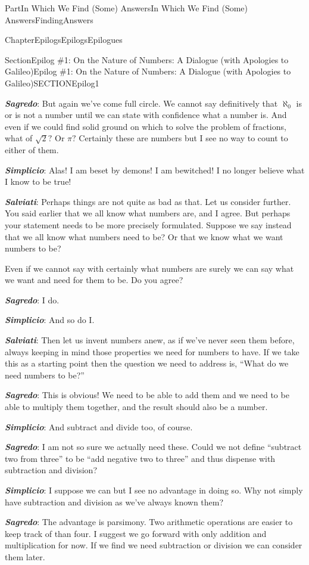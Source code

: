 \documentclass[oneside,10pt,]{book}
\newcommand{\alert}[1]{\textbf{\textit{#1}}}
\numberwithin{equation}{part}
\begin{document}
\begin{partptx}{Part}{In Which We Find (Some) Answers}{}{In Which We Find (Some) Answers}{}{}{FindingAnswers}
\begin{chapterptx}{Chapter}{Epilogs}{}{Epilogs}{}{}{Epilogues}
\begin{sectionptx}{Section}{Epilog \#1: On the Nature of Numbers: A Dialogue (with Apologies to Galileo)}{}{Epilog \#1: On the Nature of Numbers: A Dialogue (with Apologies to Galileo)}{}{}{SECTIONEpilog1}
\par
\alert{Sagredo}:  But again we've come full circle. We cannot say definitively that \(\aleph_0\) is or is not a number until we can state with confidence what a number is. And even if we could find solid ground on which to solve the problem of fractions, what of \(\sqrt{2}?\) Or \(\pi?\) Certainly these are numbers but I see no way to count to either of them.%
\par
\alert{Simplicio}:  Alas! I am beset by demons! I am bewitched! I no longer believe what I know to be true!%
\par
\alert{Salviati}:  Perhaps things are not quite as bad as that. Let us consider further. You said earlier that we all know what numbers are, and I agree. But perhaps your statement needs to be more precisely formulated. Suppose we say instead that we all know what numbers need to be? Or that we know what we want numbers to be?%
\par
Even if we cannot say with certainly what numbers are surely we can say what we want and need for them to be. Do you agree?%
\par
\alert{Sagredo}:  I do.%
\par
\alert{Simplicio}:  And so do I.%
\par
\alert{Salviati}:  Then let us invent numbers anew, as if we've never seen them before, always keeping in mind those properties we need for numbers to have. If we take this as a starting point then the question we need to address is, ``What do we need numbers to be?''%
\par
\alert{Sagredo}:  This is obvious! We need to be able to add them and we need to be able to multiply them together, and the result should also be a number.%
\par
\alert{Simplicio}:  And subtract and divide too, of course.%
\par
\alert{Sagredo}:  I am not so sure we actually need these. Could we not define ``subtract two from three'' to be ``add negative two to three'' and thus dispense with subtraction and division?%
\par
\alert{Simplicio}:  I suppose we can but I see no advantage in doing so. Why not simply have subtraction and division as we've always known them?%
\par
\alert{Sagredo}:  The advantage is parsimony. Two arithmetic operations are easier to keep track of than four. I suggest we go forward with only addition and multiplication for now. If we find we need subtraction or division we can consider them later.%

\end{sectionptx}
\end{chapterptx}
\end{partptx}
\end{document}
